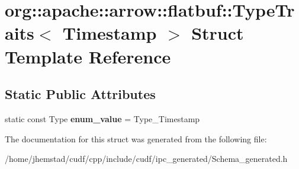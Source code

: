 \hypertarget{structorg_1_1apache_1_1arrow_1_1flatbuf_1_1TypeTraits_3_01Timestamp_01_4}{}\section{org\+:\+:apache\+:\+:arrow\+:\+:flatbuf\+:\+:Type\+Traits$<$ Timestamp $>$ Struct Template Reference}
\label{structorg_1_1apache_1_1arrow_1_1flatbuf_1_1TypeTraits_3_01Timestamp_01_4}
\subsection*{Static Public Attributes}
\begin{DoxyCompactItemize}
\item 
static const Type {\bfseries enum\+\_\+value} = Type\+\_\+\+Timestamp\hypertarget{structorg_1_1apache_1_1arrow_1_1flatbuf_1_1TypeTraits_3_01Timestamp_01_4_aa6978fc715c24eb044f3775074c4a3b1}{}\label{structorg_1_1apache_1_1arrow_1_1flatbuf_1_1TypeTraits_3_01Timestamp_01_4_aa6978fc715c24eb044f3775074c4a3b1}

\end{DoxyCompactItemize}


The documentation for this struct was generated from the following file\+:\begin{DoxyCompactItemize}
\item 
/home/jhemstad/cudf/cpp/include/cudf/ipc\+\_\+generated/Schema\+\_\+generated.\+h\end{DoxyCompactItemize}
